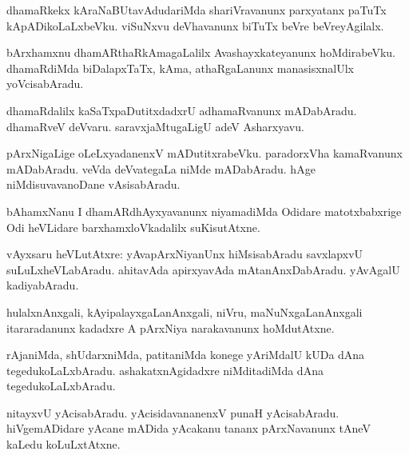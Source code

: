 \documentclass{article}
\begin{document}
\begin{mn}
dhamaRkekx kAraNaBUtavAdudariMda shariVravanunx parxyatanx paTuTx kApADikoLaLxbeVku. viSuNxvu
deVhavanunx biTuTx beVre beVreyAgilalx.
\end{mn}

\begin{mn}
bArxhamxnu dhamARthaRkAmagaLalilx Avashayxkateyanunx hoMdirabeVku. dhamaRdiMda biDalapxTaTx, kAma,
athaRgaLanunx manasisxnalUlx yoVcisabAradu.
\end{mn}

\begin{mn}
dhamaRdalilx kaSaTxpaDutitxdadxrU adhamaRvanunx mADabAradu. dhamaRveV deVvaru. saravxjaMtugaLigU 
adeV Asharxyavu.
\end{mn}

\begin{mn}
pArxNigaLige oLeLxyadanenxV mADutitxrabeVku. paradorxVha kamaRvanunx mADabAradu. veVda 
deVvategaLa niMde mADabAradu. hAge niMdisuvavanoDane vAsisabAradu.
\end{mn}

\begin{mn}
bAhamxNanu I dhamARdhAyxyavanunx niyamadiMda Odidare matotxbabxrige Odi heVLidare 
barxhamxloVkadalilx suKisutAtxne.
\end{mn}


\begin{mn}
vAyxsaru heVLutAtxre: yAvapArxNiyanUnx hiMsisabAradu savxlapxvU suLuLxheVLabAradu. ahitavAda 
apirxyavAda mAtanAnxDabAradu. yAvAgalU kadiyabAradu.
\end{mn}

\begin{mn}
hulalxnAnxgali, kAyipalayxgaLanAnxgali, niVru, maNuNxgaLanAnxgali itararadanunx kadadxre A 
pArxNiya narakavanunx hoMdutAtxne.
\end{mn}

\begin{mn}
rAjaniMda, shUdarxniMda, patitaniMda konege yAriMdalU kUDa dAna tegedukoLaLxbAradu. 
ashakatxnAgidadxre niMditadiMda dAna tegedukoLaLxbAradu.
\end{mn}

\begin{mn}
nitayxvU yAcisabAradu. yAcisidavananenxV punaH yAcisabAradu. hiVgemADidare yAcane mADida 
yAcakanu tananx pArxNavanunx tAneV kaLedu koLuLxtAtxne.
\end{mn}
\end{document}
